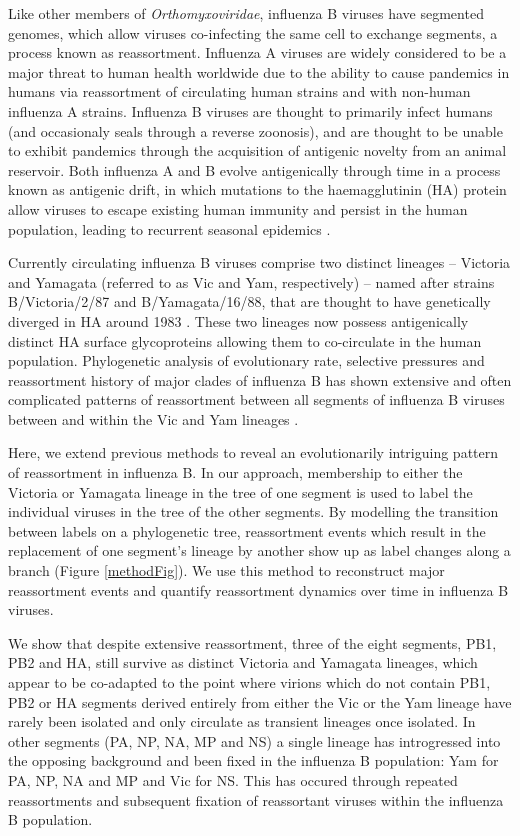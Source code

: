 \documentclass[11pt,oneside,letterpaper]{article}
\begin{document}
Like other members of \textit{Orthomyxoviridae}, influenza B viruses have segmented genomes, which allow viruses co-infecting the same cell to exchange segments, a process known as reassortment. 
Influenza A viruses are widely considered to be a major threat to human health worldwide due to the ability to cause pandemics in humans via reassortment of circulating human strains and with non-human influenza A strains. 
Influenza B viruses are thought to primarily infect humans (and occasionaly seals \cite{osterhaus2000,bodewes2013} through a reverse zoonosis), and are thought to be unable to exhibit pandemics through the acquisition of antigenic novelty from an animal reservoir. 
Both influenza A and B evolve antigenically through time in a process known as antigenic drift, in which mutations to the haemagglutinin (HA) protein allow viruses to escape existing human immunity and persist in the human population, leading to recurrent seasonal epidemics \cite{bedford2013}.

Currently circulating influenza B viruses comprise two distinct lineages -- Victoria and Yamagata (referred to as Vic and Yam, respectively) -- named after strains B/Victoria/2/87 and B/Yamagata/16/88, that are thought to have genetically diverged in HA around 1983 \cite{rota1990}. 
These two lineages now possess antigenically distinct HA surface glycoproteins \cite{kanegae1990,rota1990,nerome1998,nakagawa2002,ansaldi2003} allowing them to co-circulate in the human population.
Phylogenetic analysis of evolutionary rate, selective pressures and reassortment history of major clades of influenza B has shown extensive and often complicated patterns of reassortment between all segments of influenza B viruses between and within the Vic and Yam lineages \cite{chen2008}.

Here, we extend previous methods to reveal an evolutionarily intriguing pattern of reassortment in influenza B.
In our approach, membership to either the Victoria or Yamagata lineage in the tree of one segment is used to label the individual viruses in the tree of the other segments.
By modelling the transition between labels on a phylogenetic tree, reassortment events which result in the replacement of one segment's lineage by another show up as label changes along a branch (Figure \ref{methodFig}).
We use this method to reconstruct major reassortment events and quantify reassortment dynamics over time in influenza B viruses.

We show that despite extensive reassortment, three of the eight segments, PB1, PB2 and HA, still survive as distinct Victoria and Yamagata lineages, which appear to be co-adapted to the point where virions which do not contain PB1, PB2 or HA segments derived entirely from either the Vic or the Yam lineage have rarely been isolated and only circulate as transient lineages once isolated.
In other segments (PA, NP, NA, MP and NS) a single lineage has introgressed into the opposing background and been fixed in the influenza B population: Yam for PA, NP, NA and MP and Vic for NS.
This has occured through repeated reassortments and subsequent fixation of reassortant viruses within the influenza B population.
\end{document}
